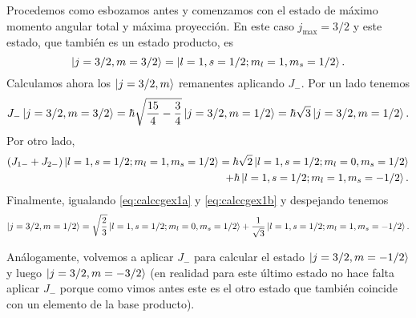 \documentclass[10pt, a4paper]{article}
\newcommand{\jpmprefactev}[2]{\hbar\sqrt{{#1} - {#2}}}
\newcommand{\jmax}{j_{\text{max}}}
\numberwithin{equation}{subsection}
\begin{document}
Procedemos como esbozamos antes y comenzamos con el estado de máximo momento
angular total y máxima proyección. En este caso $\jmax = 3/2$ y este estado,
que también es un estado producto, es
\begin{equation}
  \ket{j=3/2,m=3/2} = \ket{l=1,s=1/2;m_l=1,m_s=1/2}.
\end{equation}
Calculamos ahora los $\ket{j=3/2,m}$ remanentes aplicando $J_-$. Por un lado
tenemos
\begin{equation} \label{eq:calccgex1a}
  J_-\ket{j=3/2,m=3/2} = \jpmprefactev{\frac{15}{4}}{\frac{3}{4}}
    \ket{j=3/2,m=1/2} = \hbar\sqrt{3}\ket{j=3/2,m=1/2}.
\end{equation}
Por otro lado,
\begin{align} \label{eq:calccgex1b}
  (J_{1-} + J_{2-})\ket{l=1,s=1/2;m_l=1,m_s=1/2}
  = \hbar\sqrt{2}\ket{l=1,s=1/2;m_l=0,m_s=1/2} \nonumber \\
  + \hbar\ket{l=1,s=1/2;m_l=1,m_s=-1/2}.
\end{align}
Finalmente, igualando \eqref{eq:calccgex1a} y \eqref{eq:calccgex1b} y
despejando tenemos
\begin{equation} \label{eq:exccalc1a}
  \ket{j=3/2,m=1/2} = \sqrt{\frac{2}{3}} \ket{l=1,s=1/2;m_l=0,m_s=1/2}
    + \frac{1}{\sqrt{3}}\ket{l=1,s=1/2;m_l=1,m_s=-1/2}.
\end{equation}

Análogamente, volvemos a aplicar $J_-$ para calcular el estado
$\ket{j=3/2,m=-1/2}$ y luego $\ket{j=3/2,m=-3/2}$ (en realidad para este último
estado no hace falta aplicar $J_-$ porque como vimos antes este es el otro
estado que también coincide con un elemento de la base producto).
\end{document}
